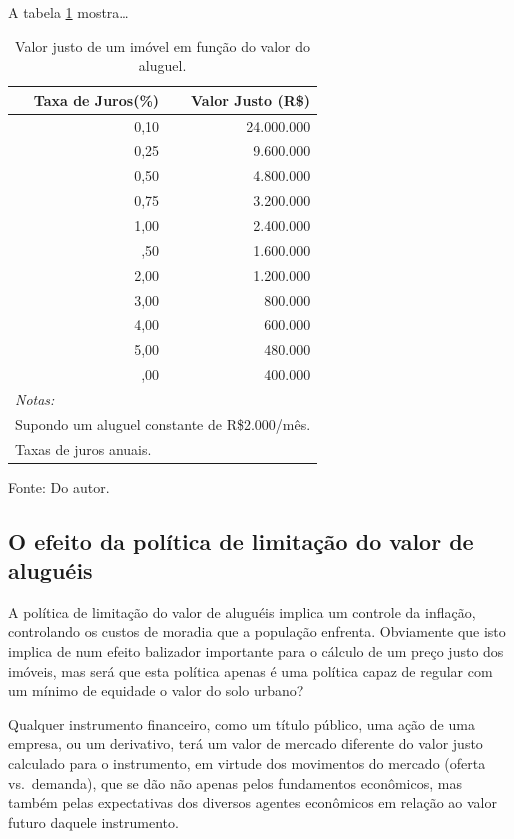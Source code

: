 \documentclass[
	12pt,				%
	oneside,			%
	a4paper,			%
	chapter=TITLE,		%
	section=TITLE,		%
	english,			%
	brazil				%
	]{abntex2}
\newcommand{\bcenter}{\begin{center}}
\newcommand{\ecenter}{\end{center}}
\begin{document}
A tabela \ref{tab:tabela-valor-justo} mostra\ldots{}
\begin{table}[H]

\caption{\label{tab:tabela-valor-justo}Valor justo de um imóvel em função do valor do aluguel.}
\centering
\begin{tabular}[t]{rr}
\toprule
Taxa de Juros(\%) & Valor Justo (R\$)\\
\midrule
0,10 & 24.000.000\\
0,25 & 9.600.000\\
0,50 & 4.800.000\\
0,75 & 3.200.000\\
1,00 & 2.400.000\\
\addlinespace
1,50 & 1.600.000\\
2,00 & 1.200.000\\
3,00 & 800.000\\
4,00 & 600.000\\
5,00 & 480.000\\
\addlinespace
6,00 & 400.000\\
\bottomrule
\multicolumn{2}{l}{\textit{Notas:}}\\
\multicolumn{2}{l}{Supondo um aluguel constante de R\$2.000/mês.}\\
\multicolumn{2}{l}{Taxas de juros anuais.}\\
\end{tabular}
\end{table}
\bcenter

Fonte: Do autor.
\ecenter

\hypertarget{o-efeito-da-poluxedtica-de-limitauxe7uxe3o-do-valor-de-aluguuxe9is}{%
\subsection{O efeito da política de limitação do valor de aluguéis}\label{o-efeito-da-poluxedtica-de-limitauxe7uxe3o-do-valor-de-aluguuxe9is}}

A política de limitação do valor de aluguéis implica um controle da inflação,
controlando os custos de moradia que a população enfrenta. Obviamente que isto
implica de num efeito balizador importante para o cálculo de um preço justo
dos imóveis, mas será que esta política apenas é uma política capaz de regular
com um mínimo de equidade o valor do solo urbano?

Qualquer instrumento financeiro, como um título público, uma ação de uma
empresa, ou um derivativo, terá um valor de mercado diferente do valor justo
calculado para o instrumento, em virtude dos movimentos do mercado (oferta
vs.~demanda), que se dão não apenas pelos fundamentos econômicos, mas também pelas
expectativas dos diversos agentes econômicos em relação ao valor futuro daquele
instrumento.
\end{document}
